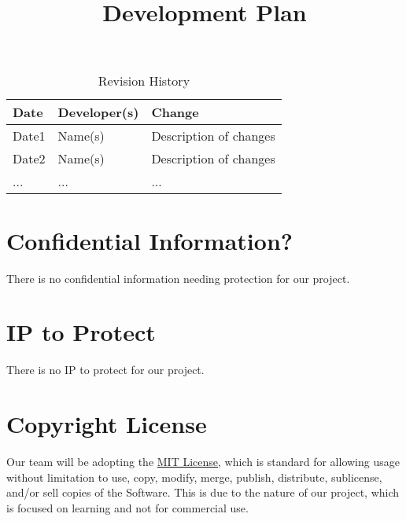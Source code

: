 \documentclass{article}
\title{Development Plan\\\progname}
\author{\authname}
\date{}
\begin{document}
\maketitle

\begin{table}[hp]
\caption{Revision History} \label{TblRevisionHistory}
\begin{tabularx}{\textwidth}{llX}
\toprule
\textbf{Date} & \textbf{Developer(s)} & \textbf{Change}\\
\midrule
Date1 & Name(s) & Description of changes\\
Date2 & Name(s) & Description of changes\\
... & ... & ...\\
\bottomrule
\end{tabularx}
\end{table}

\newpage{}



\section{Confidential Information?}

There is no confidential information needing protection for our project.

\section{IP to Protect}

There is no IP to protect for our project.

\section{Copyright License}

Our team will be adopting the \href{https://github.com/emilyperica/ScoreGen/blob/main/LICENSE}{MIT License}, which is standard for allowing usage without limitation
to use, copy, modify, merge, publish, distribute, sublicense, and/or sell
copies of the Software. This is due to the nature of our project, which is focused on learning and not for commercial use.
\end{document}
